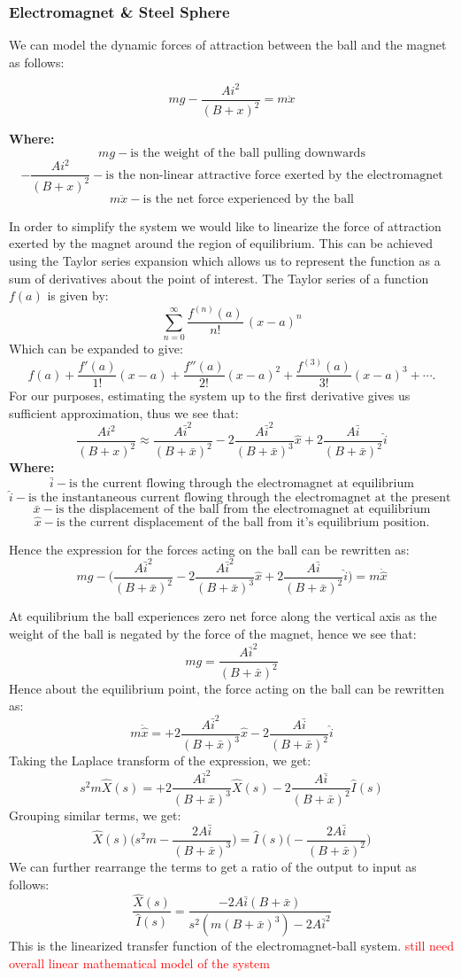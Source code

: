 \documentclass{article}
\newcommand{\xxx}[1]{\textcolor{red}{#1}}
\theoremstyle{plain}
\theoremstyle{definition}
\theoremstyle{remark}
\begin{document}
\subsubsection*{Electromagnet \& Steel Sphere}
We can model the dynamic forces of attraction between the ball and the magnet as follows:

$$mg - \frac{A i^2}{(B + x)^2} = m\ddot{x}$$

\textbf{Where:}
$$ mg - \text{is the weight of the ball pulling downwards}$$
$$- \frac{A i^2}{(B + x)^2} - \text{is the non-linear attractive force exerted by the electromagnet}$$
$$ m\ddot{x} - \text{is the net force experienced by the ball}$$

In order to simplify the system we would like to linearize the force of attraction exerted by the magnet around the region of equilibrium. This can be achieved using the Taylor series expansion which allows us to represent the function as a sum of derivatives about the point of interest. The Taylor series of a function $f(a)$ is given by:
$$\sum_{n=0}^{\infty} \frac {f^{(n)}(a)}{n!} \, (x-a)^{n}$$
Which can be expanded to give:
$$f(a)+\frac {f'(a)}{1!} (x-a)+ \frac{f''(a)}{2!} (x-a)^2+\frac{f^{(3)}(a)}{3!}(x-a)^3+ \cdots.$$
For our purposes, estimating the system up to the first derivative gives us sufficient approximation, thus we see that:
$$\frac{A i^2}{(B + x)^2} \approx \frac{A \bar{i}^2}{(B + \bar{x})^2} - 2\frac{A \bar{i}^2}{(B + \bar{x})^3}\hat{x} + 2\frac{A \bar{i}}{(B + \bar{x})^2}\hat{i}$$
\textbf{Where:}
$$\bar{i}- \text{is the current flowing through the electromagnet at equilibrium}$$
$$\hat{i}- \text{is the instantaneous current flowing through the electromagnet at the present time}$$
$$\bar{x}- \text{is the displacement of the ball from the electromagnet at equilibrium}$$
$$\hat{x}- \text{is the current displacement of the ball from it's equilibrium position.}$$

Hence the expression for the forces acting on the ball can be rewritten as:
$$mg - \Big( \frac{A \bar{i}^2}{(B + \bar{x})^2} - 2\frac{A \bar{i}^2}{(B + \bar{x})^3}\hat{x} + 2\frac{A \bar{i}}{(B + \bar{x})^2}\hat{i} \Big) = m\ddot{\hat{x}}$$

At equilibrium the ball experiences zero net force along the vertical axis as the weight of the ball is negated by the force of the magnet, hence we see that:
$$mg = \frac{A \bar{i}^2}{(B + \bar{x})^2} $$
Hence about the equilibrium point, the force acting on the ball can be rewritten as:
$$m\ddot{\hat{x}} = + 2\frac{A \bar{i}^2}{(B + \bar{x})^3}\hat{x} - 2\frac{A \bar{i}}{(B + \bar{x})^2}\hat{i}$$
Taking the Laplace transform of the expression, we get:
$$s^2 m \hat{X}(s) = + 2\frac{A \bar{i}^2}{(B + \bar{x})^3}\hat{X}(s) - 2\frac{A \bar{i}}{(B + \bar{x})^2}\hat{I}(s)$$
Grouping similar terms, we get:
$$\hat{X}(s) \Big( s^2 m - \frac{2A\bar{i}}{(B + \bar{x})^3} \Big) = \hat{I}(s) \Big( - \frac{2A\bar{i}}{(B + \bar{x})^2}\Big)$$
We can further rearrange the terms to get a ratio of the output to input as follows:
$$\frac{\hat{X}(s)}{\hat{I}(s)} = \frac{-2 A \bar{i} (B + \bar{x})}{s^2 (m (B + \bar{x})^3) - 2 A\bar{i}^2}$$
This is the linearized transfer function of the electromagnet-ball system.
\xxx{still need overall linear mathematical model of the system}
\end{document}
